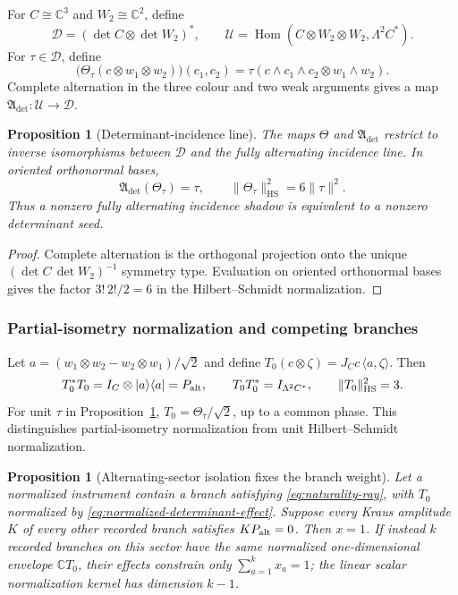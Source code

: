 \documentclass[11pt]{article}
\numberwithin{equation}{section}
\newtheorem{proposition}[theorem]{Proposition}
\theoremstyle{definition}
\theoremstyle{remark}
\newcommand{\C}{\mathbb C}
\newcommand{\Hom}{\operatorname{Hom}}
\newcommand{\HS}{\mathrm{HS}}
\newcommand{\norm}[1]{\lVert#1\rVert}
\begin{document}
For $C\cong\C^3$ and $W_2\cong\C^2$, define
\[
\mathscr D=(\det C\otimes\det W_2)^*,
\qquad
\mathscr U=
\Hom(C\otimes W_2\otimes W_2,\Lambda^2C^*).
\]
For $\tau\in\mathscr D$, define
\[
\bigl(\Theta_\tau(c\otimes w_1\otimes w_2)\bigr)(c_1,c_2)
=
\tau(c\wedge c_1\wedge c_2\otimes w_1\wedge w_2).
\]
Complete alternation in the three colour and two weak arguments gives a map
$\mathfrak A_{\det}:\mathscr U\to\mathscr D$.

\begin{proposition}[Determinant-incidence line]
\label{prop:det-incidence}
The maps $\Theta$ and $\mathfrak A_{\det}$ restrict to inverse isomorphisms
between $\mathscr D$ and the fully alternating incidence line.  In oriented
orthonormal bases,
\[
\mathfrak A_{\det}(\Theta_\tau)=\tau,
\qquad
\norm{\Theta_\tau}_{\HS}^2=6\norm{\tau}^2.
\]
Thus a nonzero fully alternating incidence shadow is equivalent to a nonzero
determinant seed.
\end{proposition}

\begin{proof}
Complete alternation is the orthogonal projection onto the unique
$(\det C\,\det W_2)^{-1}$ symmetry type.  Evaluation on oriented orthonormal
bases gives the factor $3!\,2!/2=6$ in the Hilbert--Schmidt normalization.
\end{proof}


\subsubsection{Partial-isometry normalization and competing branches}

Let $a=(w_1\otimes w_2-w_2\otimes w_1)/\sqrt2$ and define
$T_0(c\otimes\zeta)=J_Cc\,\langle a,\zeta\rangle$.
Then
\begin{equation}
 T_0^*T_0=I_C\otimes|a\rangle\langle a|=P_{\rm alt},
 \qquad T_0T_0^*=I_{\Lambda^2C^*},\qquad\norm{T_0}_{\HS}^2=3.
 \label{eq:normalized-determinant-effect}
\end{equation}
For unit $\tau$ in Proposition~\ref{prop:det-incidence},
$T_0=\Theta_\tau/\sqrt2$, up to a common phase.  This distinguishes
partial-isometry normalization from unit Hilbert--Schmidt normalization.

\begin{proposition}[Alternating-sector isolation fixes the branch weight]
\label{prop:determinant-normalization-isolation}
Let a normalized instrument contain a branch satisfying
\eqref{eq:naturality-ray}, with $T_0$ normalized by
\eqref{eq:normalized-determinant-effect}.  Suppose every Kraus amplitude $K$
of every other recorded branch satisfies $KP_{\rm alt}=0$.  Then $x=1$.
If instead $k$ recorded branches on this sector have the same normalized
one-dimensional envelope $\C T_0$, their effects constrain only
$\sum_{a=1}^k x_a=1$; the linear scalar normalization kernel has dimension
$k-1$.
\end{proposition}
\end{document}
